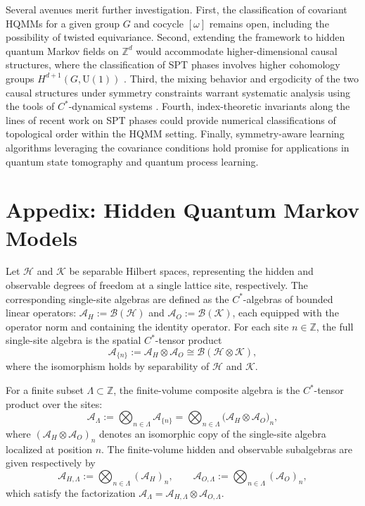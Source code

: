 \documentclass[12pt,a4paper]{article}
\begin{document}
Several avenues merit further investigation. First, the classification of covariant HQMMs for a given group $G$ and cocycle $[\omega]$ remains open, including the possibility of twisted equivariance. Second, extending the framework to hidden quantum Markov fields on $\mathbb{Z}^d$ would accommodate higher-dimensional causal structures, where the classification of SPT phases involves higher cohomology groups $H^{d+1}(G, \mathrm{U}(1))$ \cite{Chen2011b, Kallel2026, kitaev2006anyons}. Third, the mixing behavior and ergodicity of the two causal structures under symmetry constraints warrant systematic analysis using the tools of $C^*$-dynamical systems \cite{OP87}. Fourth, index-theoretic invariants along the lines of recent work on SPT phases \cite{O21, O23, Tas23} could provide numerical classifications of topological order within the HQMM setting. Finally, symmetry-aware learning algorithms leveraging the covariance conditions hold promise for applications in quantum state tomography and quantum process learning.

\appendix
\section{Appedix: Hidden Quantum Markov Models}\label{sect_prel}

Let $\mathcal{H}$ and $\mathcal{K}$ be separable Hilbert spaces, representing the hidden and observable degrees of freedom at a single lattice site, respectively. The corresponding single-site algebras are defined as the $C^*$-algebras of bounded linear operators: $\mathcal{A}_H := \mathcal{B}(\mathcal{H})$ and $\mathcal{A}_O := \mathcal{B}(\mathcal{K})$, each equipped with the operator norm and containing the identity operator. For each site $n \in \mathbb{Z}$, the full single-site algebra is the spatial $C^*$-tensor product
\[
\mathcal{A}_{\{n\}} := \mathcal{A}_H \otimes \mathcal{A}_O \cong \mathcal{B}(\mathcal{H} \otimes \mathcal{K}),
\]
where the isomorphism holds by separability of $\mathcal{H}$ and $\mathcal{K}$.

For a finite subset $\Lambda \subset \mathbb{Z}$, the finite-volume composite algebra is the $C^*$-tensor product over the sites:
\[
\mathcal{A}_\Lambda := \bigotimes_{n \in \Lambda} \mathcal{A}_{\{n\}} = \bigotimes_{n \in \Lambda} \big( \mathcal{A}_H \otimes \mathcal{A}_O \big)_n,
\]
where $(\mathcal{A}_H \otimes \mathcal{A}_O)_n$ denotes an isomorphic copy of the single-site algebra localized at position $n$. The finite-volume hidden and observable subalgebras are given respectively by
\[
\mathcal{A}_{H,\Lambda} := \bigotimes_{n \in \Lambda} (\mathcal{A}_H)_n, \qquad
\mathcal{A}_{O,\Lambda} := \bigotimes_{n \in \Lambda} (\mathcal{A}_O)_n,
\]
which satisfy the factorization $\mathcal{A}_\Lambda = \mathcal{A}_{H,\Lambda} \otimes \mathcal{A}_{O,\Lambda}$.
\end{document}
